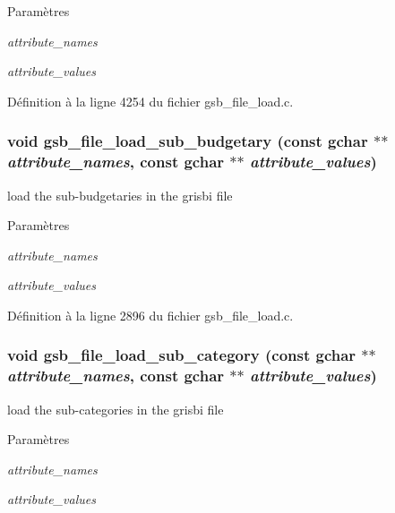 \begin{DoxyParams}{Paramètres}
\item[{\em attribute\_\-names}]\item[{\em attribute\_\-values}]\end{DoxyParams}


Définition à la ligne 4254 du fichier gsb\_\-file\_\-load.c.

\subsubsection[{gsb\_\-file\_\-load\_\-sub\_\-budgetary}]{\setlength{\rightskip}{0pt plus 5cm}void gsb\_\-file\_\-load\_\-sub\_\-budgetary (const gchar $\ast$$\ast$ {\em attribute\_\-names}, \/  const gchar $\ast$$\ast$ {\em attribute\_\-values})}\label{gsb__file__load_8h_a709caad01ac9eea898ebca1fb200a8de}
load the sub-\/budgetaries in the grisbi file


\begin{DoxyParams}{Paramètres}
\item[{\em attribute\_\-names}]\item[{\em attribute\_\-values}]\end{DoxyParams}


Définition à la ligne 2896 du fichier gsb\_\-file\_\-load.c.

\subsubsection[{gsb\_\-file\_\-load\_\-sub\_\-category}]{\setlength{\rightskip}{0pt plus 5cm}void gsb\_\-file\_\-load\_\-sub\_\-category (const gchar $\ast$$\ast$ {\em attribute\_\-names}, \/  const gchar $\ast$$\ast$ {\em attribute\_\-values})}\label{gsb__file__load_8h_a9b791438458e7fdace00a67a105d313f}
load the sub-\/categories in the grisbi file


\begin{DoxyParams}{Paramètres}
\item[{\em attribute\_\-names}]\item[{\em attribute\_\-values}]\end{DoxyParams}


